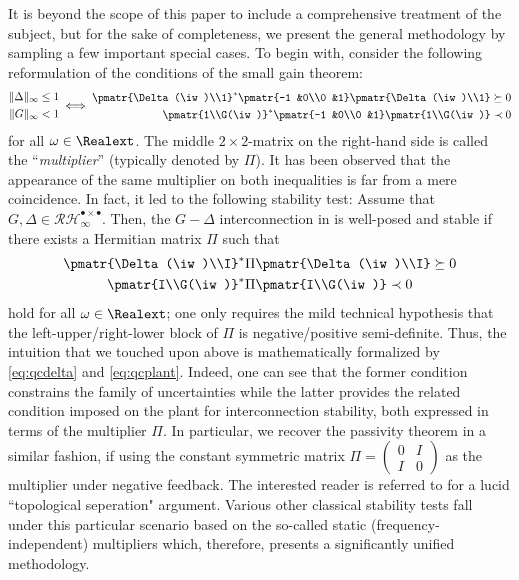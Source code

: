 It is beyond the scope of this paper to include a comprehensive treatment of the subject, but for the sake of completeness, we present the general methodology by sampling a few important special cases. To begin with, consider the following reformulation of the conditions of the small gain theorem:
\begin{equation}
\begin{aligned}
\|\Delta\|_\infty &\leq 1\\
\|G\|_\infty &< 1
\end{aligned} \iff
{\scriptstyle \begin{aligned}
\pmatr{\Delta(\iw)\\1}^*\pmatr{-1 &0\\0 &1}\pmatr{\Delta(\iw)\\1} &\succeq 0\\
\pmatr{1\\G(\iw)}^*\pmatr{-1 &0\\0 &1}\pmatr{1\\G(\iw)} &\prec 0
\end{aligned}}
\label{eq:smqf}
\end{equation}
for all $\omega\in\Realext$. The middle {$2\times2$-matrix} on the right-hand side is called the ``{\em multiplier}'' (typically denoted by $\Pi$). It has been observed that the appearance of the same multiplier on both inequalities is far from a mere coincidence. In fact, it led to the following stability test: Assume that $G,\Delta\in \mathcal{RH}^{\bullet \times \bullet}_\infty$. Then, the $G-\Delta$ interconnection {in } is well-posed and stable if there exists a Hermitian matrix $\Pi$ such that
\begin{align}
\pmatr{\Delta(\iw)\\I}^* &\Pi\pmatr{\Delta(\iw)\\I} \succeq 0  \label{eq:qcdelta}\\
\pmatr{I\\G(\iw)}^* &\Pi\pmatr{I\\G(\iw)} \prec 0 \label{eq:qcplant}
\end{align}
hold for all $\omega\in\Realext$; one only requires the mild technical hypothesis that the left-upper/right-lower block of $\Pi$ is negative/positive semi-definite. Thus, the intuition that we touched upon above is mathematically formalized by \eqref{eq:qcdelta} and \eqref{eq:qcplant}. Indeed, one can see that the former condition constrains the family of uncertainties while the latter {provides the related condition} imposed on the plant for interconnection stability, both expressed in terms of the multiplier $\Pi$. In particular, we recover the passivity theorem in a similar fashion, if {using} the constant symmetric matrix $\Pi=\left(\begin{smallmatrix}0 &I \\ I &0 \end{smallmatrix} \right)$ as the multiplier under negative feedback. The interested reader is referred to \cite{safonov} for a lucid ``topological seperation" argument. Various other classical stability tests fall under this particular {scenario based on the so-called static (frequency-independent) multipliers which, therefore, presents} a significantly unified methodology.

